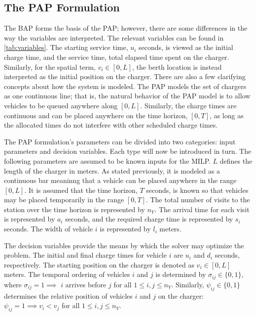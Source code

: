 \documentclass[utf8]{FrontiersinHarvard}
\newcommand{\EDIT}[1]{{\color{blue}#1}}                                         %
\begin{document}
\subsection{The PAP Formulation}
\label{sec:the-pap-formulation}
The BAP forms the basis of the PAP; however, there are some differences in the way the variables are interpreted.
\EDIT{The relevant variables can be found in \autoref{tab:variables}}. The starting service time, \(u_i\)
seconds, is viewed as the initial charge time, and the service time, total elapsed time spent on the charger. Similarly,
for the spatial term, \(v_i \in [0,L]\), the berth location is instead interpreted as the initial position on the charger.
There are also a few clarifying concepts about how the system is modeled. The PAP models the set of chargers as one
continuous line; that is, the natural behavior of the PAP model is to allow vehicles to be queued anywhere along
\([0,L]\). Similarly, the charge times are continuous and can be placed anywhere on the time horizon, \([0,T]\), as long as
the allocated times do not interfere with other scheduled charge times.

The PAP formulation's parameters can be divided into two categories: input parameters and decision variables. Each type
will now be introduced in turn. The following parameters are assumed to be known inputs for the MILP. \(L\) defines the
length of the charger in meters. As stated previously, it is modeled as a continuous bar meaninng that a vehicle can be
placed anywhere in the range \([0,L]\). It is assumed that the time horizon, \(T\) seconds, is known so that vehicles may be
placed temporarily in the range \([0,T]\). The total number of visits to the station over the time horizon is represented
by \(n_V\). The arrival time for each visit is represented by \(a_i\) seconds, and the required charge time is represented
by \(s_i\) seconds. The width of vehicle \(i\) is represented by \(l_i\) meters.

The decision variables provide the means by which the solver may optimize the problem. The initial and final charge
times for vehicle \(i\) are \(u_i\) and \(d_i\) seconds, respectively. The starting position on the charger is denoted as \(v_i
\in [0,L]\) meters. The temporal ordering of vehicles \(i\) and \(j\) is determined by \(\sigma_{ij} \in \{0, 1\}\), where \(\sigma_{ij} = 1
\implies\) \(i\) arrives before \(j\) for all \(1 \le i,j \le n_V\). Similarly, \(\psi_{ij} \in \{0, 1\}\) determines the relative
position of vehicles \(i\) and \(j\) on the charger: \(\psi_{ij} = 1 \implies v_i < v_j\) for all \(1 \le i,j \le n_V\).
\end{document}
